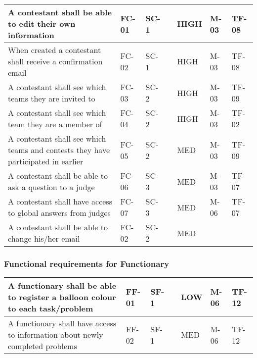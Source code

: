 \begin{supertabular}{|m{1.1191599in}|m{0.35875985in}|m{0.33795986in}|m{1.2580599in}|m{0.5045598in}|m{1.2476599in}|m{1.0670599in}|}
\hline
A contestant shall be able to edit their own information & FC-01 & SC-1 & &
HIGH & M-03 & TF-08\\\hline When created a contestant shall receive a
confirmation email & FC-02 & SC-1 & & HIGH & M-03 & TF-08\\\hline A contestant
shall see which teams they are invited to & FC-03 & SC-2 & & HIGH & M-03 &
TF-09\\\hline A contestant shall see which team they are a member of & FC-04 &
SC-2 & & HIGH & M-03 & TF-02\\\hline A contestant shall see which teams and
contests they have participated in earlier & FC-05 & SC-2 & & MED & M-03 &
TF-09\\ \hline A contestant shall be able to ask a question to a judge & FC-06
& SC-3 &
 & MED & M-03 & TF-07\\\hline A contestant shall have access to global answers
 from judges & FC-07 & SC-3 & & MED & M-06 & TF-07\\\hline A contestant shall
 be able to change his/her email & FC-02 & SC-2 & & MED & & \\\hline
\end{supertabular}

\subsubsection{Functional requirements for Functionary}

\begin{tabular}{|m{1.1191599in}|m{0.33795986in}|m{0.33795986in}|m{1.2580599in}|m{0.5045598in}|m{1.1191599in}|m{1.0775598in}|}
\hline A functionary shall be able to register a balloon colour to each
task/problem & FF-01 & SF-1 &
 & LOW & M-06 & TF-12\\\hline A functionary shall have access to information
about newly completed problems & FF-02 & SF-1 &
 & MED & M-06 & TF-12\\\hline
\end{tabular}

